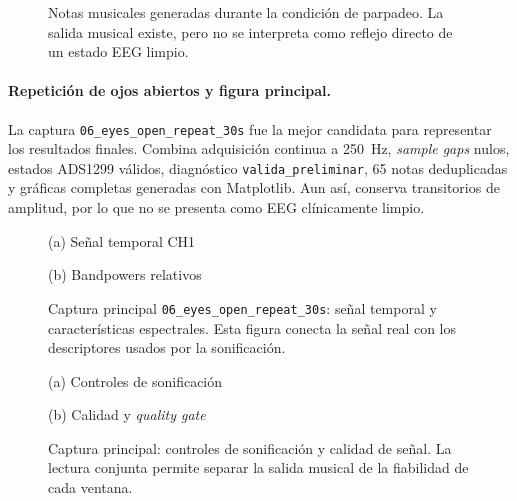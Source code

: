 \documentclass[../main.tex]{subfiles}
\begin{document}
\begin{figure}[htbp]
    \centering
    \caption{Notas musicales generadas durante la condición de parpadeo. La salida musical existe, pero no se interpreta como reflejo directo de un estado EEG limpio.}
    \label{fig:validacion_s01_04_notes}
\end{figure}

\paragraph{Repetición de ojos abiertos y figura principal.}
La captura \texttt{06\_eyes\_open\_repeat\_30s} fue la mejor candidata para representar los resultados finales. Combina adquisición continua a \SI{250}{\hertz}, \textit{sample gaps} nulos, estados ADS1299 válidos, diagnóstico \texttt{valida\_preliminar}, 65 notas deduplicadas y gráficas completas generadas con Matplotlib. Aun así, conserva transitorios de amplitud, por lo que no se presenta como EEG clínicamente limpio.

\begin{figure}[htbp]
    \centering
    \begin{minipage}{0.49\textwidth}
        \centering
        \small (a) Señal temporal CH1
    \end{minipage}
    \hfill
    \begin{minipage}{0.49\textwidth}
        \centering
        \small (b) Bandpowers relativos
    \end{minipage}
    \caption{Captura principal \texttt{06\_eyes\_open\_repeat\_30s}: señal temporal y características espectrales. Esta figura conecta la señal real con los descriptores usados por la sonificación.}
    \label{fig:validacion_s01_06_eeg_bands}
\end{figure}

\begin{figure}[htbp]
    \centering
    \begin{minipage}{0.49\textwidth}
        \centering
        \small (a) Controles de sonificación
    \end{minipage}
    \hfill
    \begin{minipage}{0.49\textwidth}
        \centering
        \small (b) Calidad y \textit{quality gate}
    \end{minipage}
    \caption{Captura principal: controles de sonificación y calidad de señal. La lectura conjunta permite separar la salida musical de la fiabilidad de cada ventana.}
    \label{fig:validacion_s01_06_controls_quality}
\end{figure}
\end{document}
